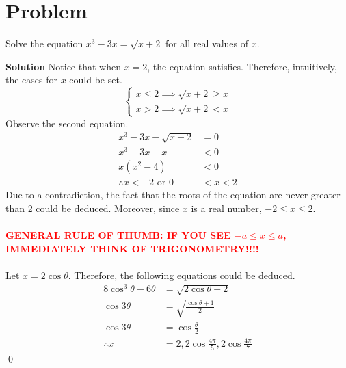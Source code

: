 \documentclass{article}
\newenvironment{solution}{\begin{trivlist}\item[]{\bf Solution}}{\qed \end{trivlist}}
\begin{document}
\section*{Problem}
Solve the equation $x^3 - 3x = \sqrt{x + 2}$ for all real values of $x$.
\begin{solution}
Notice that when $x = 2$, the equation satisfies. Therefore, intuitively, the cases for $x$ could be set.
\[
\begin{cases}
    x \leq 2 \implies \sqrt{x + 2} \geq x \\
    x > 2 \implies \sqrt{x + 2} < x
\end{cases}
\]
Observe the second equation.
\begin{align*}
    x^3 - 3x - \sqrt{x + 2} &= 0 \\
    x^3 - 3x - x &< 0 \\
    x(x^2 - 4) &< 0 \\
    \therefore x < -2 \text{ or } 0 &< x < 2
\end{align*}
Due to a contradiction, the fact that the roots of the equation are never greater than 2 could be deduced. Moreover, since $x$ is a real number, $-2 \leq x \leq 2$.
\\\\
\textcolor{red}{\textbf{GENERAL RULE OF THUMB: IF YOU SEE $-a \leq x \leq a$, IMMEDIATELY THINK OF TRIGONOMETRY!!!!}}
\\\\
Let $x = 2\cos\theta$. Therefore, the following equations could be deduced.
\begin{align*}
    8\cos^3\theta - 6\theta &= \sqrt{2\cos\theta + 2} \\
    \cos3\theta &= \sqrt{\frac{\cos\theta + 1}{2}} \\
    \cos3\theta &= \cos\frac{\theta}{2} \\
    \therefore x &= \boxed{2, 2\cos\frac{4\pi}{5}, 2\cos\frac{4\pi}{7}}
\end{align*}
\end{solution}
\end{document}
